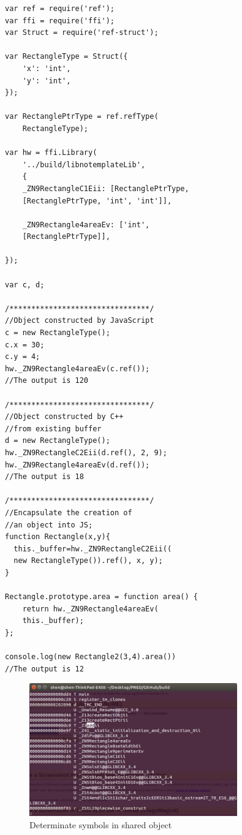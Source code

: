 \begin{verbatim}
var ref = require('ref');
var ffi = require('ffi');
var Struct = require('ref-struct');

var RectangleType = Struct({
    'x': 'int',
    'y': 'int',
});

var RectanglePtrType = ref.refType(
    RectangleType);

var hw = ffi.Library(
    '../build/libnotemplateLib', 
    {
    _ZN9RectangleC1Eii: [RectanglePtrType, 
    [RectanglePtrType, 'int', 'int']], 
    
    _ZN9Rectangle4areaEv: ['int', 
    [RectanglePtrType]], 
   
});

var c, d;

/********************************/
//Object constructed by JavaScript
c = new RectangleType();
c.x = 30;
c.y = 4;
hw._ZN9Rectangle4areaEv(c.ref());
//The output is 120

/********************************/
//Object constructed by C++ 
//from existing buffer
d = new RectangleType();
hw._ZN9RectangleC2Eii(d.ref(), 2, 9);
hw._ZN9Rectangle4areaEv(d.ref());
//The output is 18

/********************************/
//Encapsulate the creation of
//an object into JS;
function Rectangle(x,y){
  this._buffer=hw._ZN9RectangleC2Eii((
  new RectangleType()).ref(), x, y); 
}

Rectangle.prototype.area = function area() {
    return hw._ZN9Rectangle4areaEv(
    this._buffer);
};

console.log(new Rectangle2(3,4).area())
//The output is 12

\end{verbatim}

\begin{figure} 
   \center
    \includegraphics[width=0.8\textwidth]{Images/nmCommand}
     
   \caption{Determinate symbols in shared object}
   \label{fig:nmCommand}
\end{figure}


